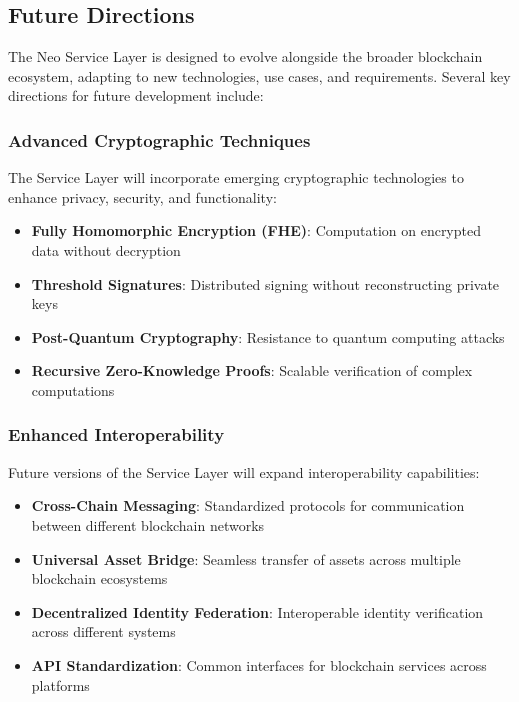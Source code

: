 \documentclass{article}
\begin{document}
\subsection{Future Directions}
\label{subsec:nsl-future}

The Neo Service Layer is designed to evolve alongside the broader blockchain ecosystem, adapting to new technologies, use cases, and requirements. Several key directions for future development include:

\subsubsection{Advanced Cryptographic Techniques}
\label{subsubsec:advanced-crypto}

The Service Layer will incorporate emerging cryptographic technologies to enhance privacy, security, and functionality:

\begin{itemize}
    \item \textbf{Fully Homomorphic Encryption (FHE)}: Computation on encrypted data without decryption
    \item \textbf{Threshold Signatures}: Distributed signing without reconstructing private keys
    \item \textbf{Post-Quantum Cryptography}: Resistance to quantum computing attacks
    \item \textbf{Recursive Zero-Knowledge Proofs}: Scalable verification of complex computations
\end{itemize}

\subsubsection{Enhanced Interoperability}
\label{subsubsec:enhanced-interop}

Future versions of the Service Layer will expand interoperability capabilities:

\begin{itemize}
    \item \textbf{Cross-Chain Messaging}: Standardized protocols for communication between different blockchain networks
    \item \textbf{Universal Asset Bridge}: Seamless transfer of assets across multiple blockchain ecosystems
    \item \textbf{Decentralized Identity Federation}: Interoperable identity verification across different systems
    \item \textbf{API Standardization}: Common interfaces for blockchain services across platforms
\end{itemize}
\end{document}
